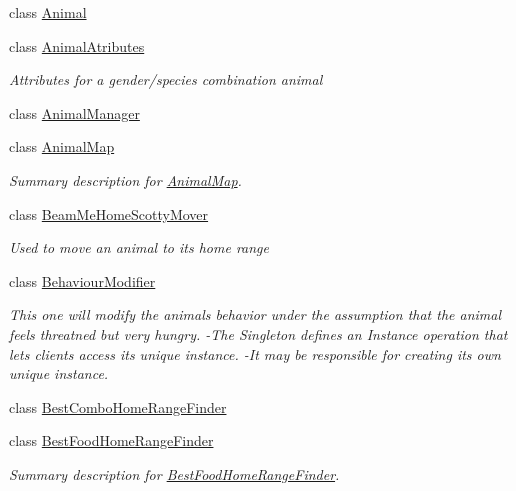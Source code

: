 \begin{DoxyCompactItemize}
\item 
class \hyperlink{class_p_a_z___dispersal_1_1_animal}{Animal}
\item 
class \hyperlink{class_p_a_z___dispersal_1_1_animal_atributes}{Animal\-Atributes}
\begin{DoxyCompactList}\small\item\em Attributes for a gender/species combination animal \end{DoxyCompactList}\item 
class \hyperlink{class_p_a_z___dispersal_1_1_animal_manager}{Animal\-Manager}
\item 
class \hyperlink{class_p_a_z___dispersal_1_1_animal_map}{Animal\-Map}
\begin{DoxyCompactList}\small\item\em Summary description for \hyperlink{class_p_a_z___dispersal_1_1_animal_map}{Animal\-Map}. \end{DoxyCompactList}\item 
class \hyperlink{class_p_a_z___dispersal_1_1_beam_me_home_scotty_mover}{Beam\-Me\-Home\-Scotty\-Mover}
\begin{DoxyCompactList}\small\item\em Used to move an animal to its home range \end{DoxyCompactList}\item 
class \hyperlink{class_p_a_z___dispersal_1_1_behaviour_modifier}{Behaviour\-Modifier}
\begin{DoxyCompactList}\small\item\em This one will modify the animals behavior under the assumption that the animal feels threatned but very hungry. -\/\-The Singleton defines an Instance operation that lets clients access its unique instance. -\/\-It may be responsible for creating its own unique instance. \end{DoxyCompactList}\item 
class \hyperlink{class_p_a_z___dispersal_1_1_best_combo_home_range_finder}{Best\-Combo\-Home\-Range\-Finder}
\begin{DoxyCompactList}\small\item\em \end{DoxyCompactList}\item 
class \hyperlink{class_p_a_z___dispersal_1_1_best_food_home_range_finder}{Best\-Food\-Home\-Range\-Finder}
\begin{DoxyCompactList}\small\item\em Summary description for \hyperlink{class_p_a_z___dispersal_1_1_best_food_home_range_finder}{Best\-Food\-Home\-Range\-Finder}. \end{DoxyCompactList}\item 

\end{DoxyCompactItemize}
